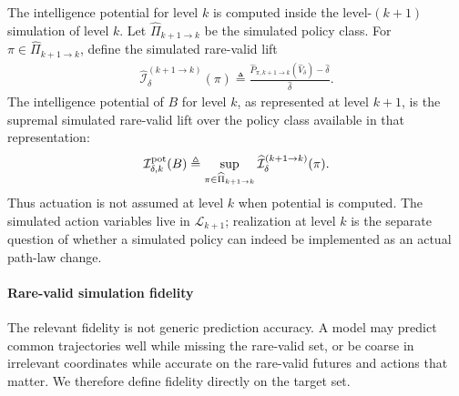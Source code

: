 \documentclass[
  aps,
  prresearch,
  reprint,
  amsmath,
  amssymb,
  superscriptaddress,
  nofootinbib,
  longbibliography
]{revtex4-2}
\def\EQSP{3pt}
\newcommand{\cgather}[2][\EQSP]{\begingroup\setlength\abovedisplayskip{#1}\setlength\belowdisplayskip{#1}\begin{gather} #2 \end{gather}\endgroup\noindent}
\newcommand{\calI}{\mathcal{I}}
\begin{document}
The intelligence potential for level \(k\) is computed inside the level-\((k+1)\) simulation of level \(k\). Let \(\widehat\Pi_{k+1\to k}\) be the simulated policy class. For \(\pi\in\widehat\Pi_{k+1\to k}\), define the simulated rare-valid lift
\cgather{
    \widehat{\calI}_{\delta}^{(k+1\to k)}(\pi)
    \triangleq
    \frac{
    \widehat P_{\pi,k+1\to k}(\widehat V_\delta)
    -
    \widehat\delta
    }
    {\widehat\delta}.
    \label{eq:potential_intelligence_policy}
}
The intelligence potential of \(B\) for level \(k\), as represented at level \(k+1\), is the supremal simulated rare-valid lift over the policy class available in that representation:
\cgather{
    \calI^{\rm pot}_{\delta,k}(B)
    \triangleq 
    \sup_{\pi\in\widehat\Pi_{k+1\to k}}
    \widehat{\calI}_{\delta}^{(k+1\to k)}(\pi).
    \label{eq:potential_intelligence_sup}
}
Thus actuation is not assumed at level \(k\) when potential is computed. The simulated action variables live in \(\mathcal L_{k+1}\); realization at level \(k\) is the separate question of whether a simulated policy can indeed be  implemented as an actual path-law change.

\paragraph{Rare-valid simulation fidelity}
\label{sec:rv_fidelity}

The relevant fidelity is not generic prediction accuracy. A model may predict common trajectories well while missing the rare-valid set, or be coarse in irrelevant coordinates while accurate on the rare-valid futures and actions that matter. We therefore define fidelity directly on the target set.
\end{document}
